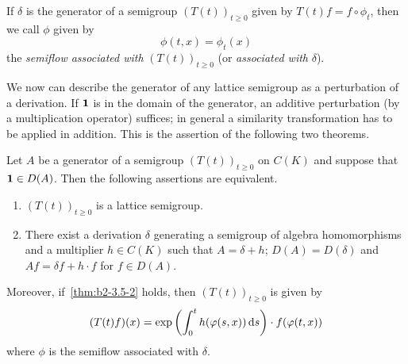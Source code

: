 If\/ $\delta$ is the generator of a semigroup $(T(t))_{t \geq 0}$ given by $T(t)f = f \circ \phi_{t}$, then we call $\phi$ given by 
%
\[
	\phi(t,x) = \phi_{t}(x)
\]
%
the \emph{semiflow associated with} $(T(t))_{t \geq 0}$ (or \emph{associated with} $\delta$).

We now can describe the generator of any lattice semigroup as a perturbation of a derivation.
If\/ $\mathbf{1}$ is in the domain of the generator, an additive perturbation (by a multiplication operator) suffices; in general a similarity transformation has to be applied in addition.
This is the assertion of the following two theorems.
\begin{theorem}\label{thm:b2-3.5}
Let $A$ be a generator of a semigroup $(T(t))_{t \geq 0}$ on $C(K)$ and suppose that $\mathbf{1} \in D(A)$.
Then the following assertions are equivalent.
\begin{enumerate}[\upshape (a)]
\item \label{thm:b2-3.5-1}
$(T(t))_{t \geq 0}$ is a lattice semigroup.
\item \label{thm:b2-3.5-2}
There exist a derivation $\delta$ generating a semigroup of algebra homomorphisms and a multiplier $h \in C(K)$ such that $A = \delta + h$; \ie  $D(A) = D(\delta)$ and $Af = \delta f + h \cdot f$ for $f \in D(A)$.
\end{enumerate}

Moreover, if~\ref{thm:b2-3.5-2} holds, then $(T(t))_{t \geq 0}$ is given by
\begin{equation}\label{eq:b2-3.6}
(T(t)f)(x) = \exp\left(\int_{0}^{t} h(\phi(s,x)) \ds \right) \cdot f(\phi(t,x))
\end{equation}
where $\phi$ is the semiflow associated with $\delta$.
\end{theorem}
